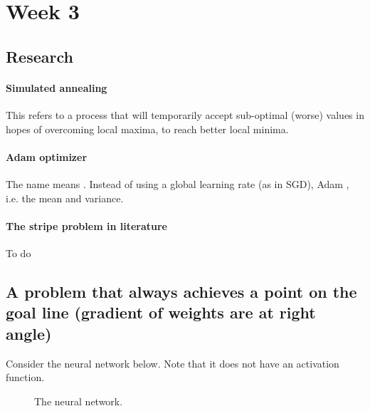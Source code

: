 \documentclass{article}
\begin{document}
\section{Week 3}

\subsection{Research}
\paragraph{Simulated annealing}
This refers to a process that will temporarily accept sub-optimal (worse) values in hopes of overcoming local maxima, to reach better local minima.

\paragraph{Adam optimizer}
The name means .
Instead of using a global learning rate (as in SGD), Adam  \cite{adam}, i.e. the mean and variance.

\paragraph{The stripe problem in literature}
To do

\subsection{A problem that always achieves a point on the goal line (gradient of weights are at right angle)}

Consider the neural network below. Note that it does not have an activation function.

\begin{figure}[h]
    \begin{center}
    \end{center}
    \caption{The neural network.}
\end{figure}
\end{document}
